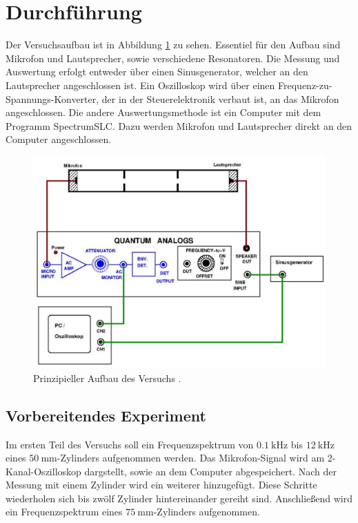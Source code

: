 \section{Durchführung}
\label{sec:Durchführung}
Der Versuchsaufbau ist in Abbildung \ref{fig:aufbau} zu sehen. Essentiel für den Aufbau sind Mikrofon und Lautsprecher, sowie verschiedene Resonatoren.
Die Messung und Auswertung erfolgt entweder über einen Sinusgenerator, welcher an den Lautsprecher angeschlossen ist.
Ein Oszilloskop wird über einen Frequenz-zu-Spannungs-Konverter, der in der Steuerelektronik verbaut ist, an das Mikrofon angeschlossen.
Die andere Auswertungsmethode ist ein Computer mit dem Programm SpectrumSLC. Dazu werden Mikrofon und Lautsprecher direkt an den Computer angeschlossen.
\begin{figure}
    \centering
    \includegraphics[width=\textwidth]{pictures/Aufbau.png}
    \caption{Prinzipieller Aufbau des Versuchs \cite{sample}.}
    \label{fig:aufbau}
\end{figure}
\subsection{Vorbereitendes Experiment}
Im ersten Teil des Versuchs soll ein Frequenzspektrum von $\SI{0.1}{\kilo\hertz}$ bis $\SI{12}{\kilo\hertz}$ eines $\SI{50}{\milli\meter}$-Zylinders aufgenommen werden.
Das Mikrofon-Signal wird am 2-Kanal-Oszilloskop dargstellt, sowie an dem Computer abgespeichert.
Nach der Messung mit einem Zylinder wird ein weiterer hinzugefügt. Diese Schritte wiederholen sich bis zwölf Zylinder hintereinander gereiht sind.
Anschließend wird ein Frequenzspektrum eines $\SI{75}{\milli\meter}$-Zylinders aufgenommen.


